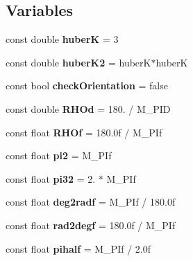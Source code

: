 \subsection*{Variables}
\begin{DoxyCompactItemize}
\item 
const double {\bfseries huberK} = 3\hypertarget{namespaceMultiColSLAM_aab19351bf1e43db07d71596aa78d53c9}{}\label{namespaceMultiColSLAM_aab19351bf1e43db07d71596aa78d53c9}

\item 
const double {\bfseries huber\+K2} = huberK$\ast$huberK\hypertarget{namespaceMultiColSLAM_ad819db726019109778882c0fa73b3809}{}\label{namespaceMultiColSLAM_ad819db726019109778882c0fa73b3809}

\item 
const bool {\bfseries check\+Orientation} = false\hypertarget{namespaceMultiColSLAM_a3307df1372d49234ac2b9a929b71433c}{}\label{namespaceMultiColSLAM_a3307df1372d49234ac2b9a929b71433c}

\item 
const double {\bfseries R\+H\+Od} = 180. / M\+\_\+\+P\+ID\hypertarget{namespaceMultiColSLAM_a184958931747f2a57ae7d176fb5f4f4c}{}\label{namespaceMultiColSLAM_a184958931747f2a57ae7d176fb5f4f4c}

\item 
const float {\bfseries R\+H\+Of} = 180.\+0f / M\+\_\+\+P\+If\hypertarget{namespaceMultiColSLAM_a5b5507236c7987d97f2e21e996733dca}{}\label{namespaceMultiColSLAM_a5b5507236c7987d97f2e21e996733dca}

\item 
const float {\bfseries pi2} = M\+\_\+\+P\+If\hypertarget{namespaceMultiColSLAM_ae208f6ebdd00626139b6bd66aa96f20e}{}\label{namespaceMultiColSLAM_ae208f6ebdd00626139b6bd66aa96f20e}

\item 
const float {\bfseries pi32} = 2. $\ast$ M\+\_\+\+P\+If\hypertarget{namespaceMultiColSLAM_a73b30dc7c8196efc049f0cc8f1860cb3}{}\label{namespaceMultiColSLAM_a73b30dc7c8196efc049f0cc8f1860cb3}

\item 
const float {\bfseries deg2radf} = M\+\_\+\+P\+If / 180.\+0f\hypertarget{namespaceMultiColSLAM_aec42ca5b939b00f2adb4f0be4614e42e}{}\label{namespaceMultiColSLAM_aec42ca5b939b00f2adb4f0be4614e42e}

\item 
const float {\bfseries rad2degf} = 180.\+0f / M\+\_\+\+P\+If\hypertarget{namespaceMultiColSLAM_a284e272778b463c6953872046b767b32}{}\label{namespaceMultiColSLAM_a284e272778b463c6953872046b767b32}

\item 
const float {\bfseries pihalf} = M\+\_\+\+P\+If / 2.\+0f\hypertarget{namespaceMultiColSLAM_a4991dc407493f15472a0fd46b2ed9ec3}{}\label{namespaceMultiColSLAM_a4991dc407493f15472a0fd46b2ed9ec3}

\end{DoxyCompactItemize}


